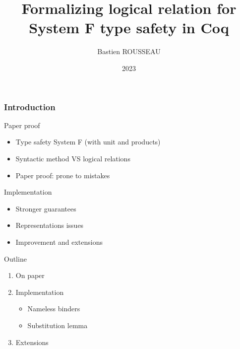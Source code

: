 \documentclass[xcolor={usenames,dvipsnames}]{beamer}
\title{Formalizing logical relation for System F type safety in Coq}
\author{Bastien ROUSSEAU}
\date{2023}
\begin{document}
\frame{\titlepage}

\begin{frame}
  \frametitle{Introduction}


  \begin{block}{Paper proof}
    \begin{itemize}
      \item Type safety System F (with unit and products)
      \item Syntactic method VS logical relations
      \item Paper proof: prone to mistakes
    \end{itemize}
  \end{block}

  \begin{block}{Implementation}
    \begin{itemize}
      \item Stronger guarantees
      \item Representations issues
      \item Improvement and extensions
    \end{itemize}
  \end{block}

\end{frame}

\begin{frame}{Outline}
  \begin{enumerate}
    \item On paper
    \item Implementation
          \begin{itemize}
            \item Nameless binders
            \item Substitution lemma
          \end{itemize}
    \item Extensions
  \end{enumerate}
\end{frame}

\end{document}
